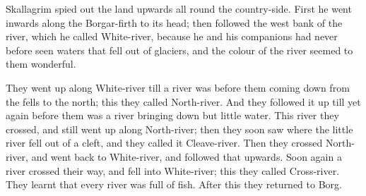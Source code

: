 Skallagrim spied out the land upwards all round the country-side. First he went inwards along the Borgar-firth to its head; then followed the west bank of the river, which he called White-river, because he and his companions had never before seen waters that fell out of glaciers, and the colour of the river seemed to them wonderful.

They went up along White-river till a river was before them coming down from the fells to the north; this they called North-river. And they followed it up till yet again before them was a river bringing down but little water. This river they crossed, and still went up along North-river; then they soon saw where the little river fell out of a cleft, and they called it Cleave-river. Then they crossed North-river, and went back to White-river, and followed that upwards. Soon again a river crossed their way, and fell into White-river; this they called Cross-river. They learnt that every river was full of fish. After this they returned to Borg.
